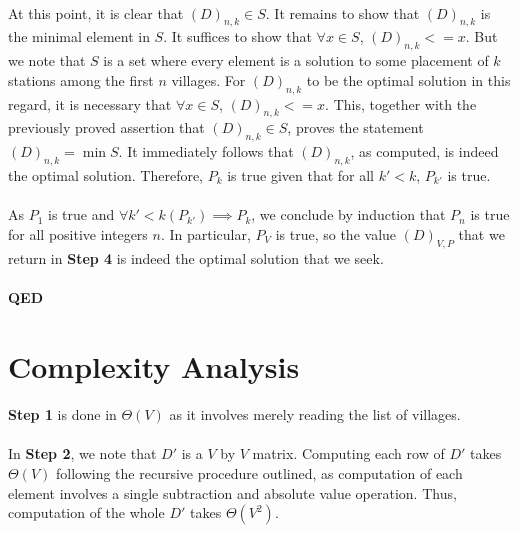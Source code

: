 \documentclass[twocolumn]{article}
\begin{document}
		\paragraph{}
		At this point, it is clear that $(D)_{n, k} \in S$. It remains to show that $(D)_{n, k}$ is the minimal element in $S$. It suffices to show that $\forall x \in S$, $(D)_{n, k} <= x$. But we note that $S$ is a set where every element is a solution to some placement of $k$ stations among the first $n$ villages. For $(D)_{n, k}$ to be the optimal solution in this regard, it is necessary that $\forall x \in S$, $(D)_{n, k} <= x$. This, together with the previously proved assertion that $(D)_{n, k} \in S$, proves the statement $(D)_{n, k} = \min S$. It immediately follows that $(D)_{n, k}$, as computed, is indeed the optimal solution. Therefore, $P_k$ is true given that for all $k' < k$, $P_{k'}$ is true.
		
		\paragraph{}
		As $P_1$ is true and $\forall k' < k (P_{k'}) \implies P_k$, we conclude by induction that $P_n$ is true for all positive integers $n$. In particular, $P_V$ is true, so the value $(D)_{V, P}$ that we return in \textbf{Step 4} is indeed the optimal solution that we seek.
		
		\paragraph{QED}
		
	
	\section{Complexity Analysis}
		\paragraph{}
		\textbf{Step 1} is done in $\Theta(V)$ as it involves merely reading the list of villages.
		
		\paragraph{}
		In \textbf{Step 2}, we note that $D'$ is a $V$ by $V$ matrix. Computing each row of $D'$ takes $\Theta(V)$ following the recursive procedure outlined, as computation of each element involves a single subtraction and absolute value operation. Thus, computation of the whole $D'$ takes $\Theta(V^2)$.
		
\end{document}
